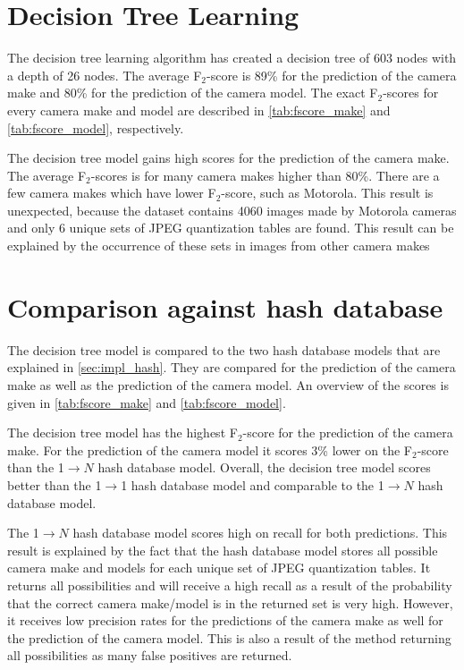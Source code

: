 \section{Decision Tree Learning}
The decision tree learning algorithm has created a decision tree of 603 nodes with a depth of 26 nodes. The average F$_2$-score is 89\% for the prediction of the camera make and 80\% for the prediction of the camera model. The exact F$_2$-scores for every camera make and model are described in \autoref{tab:fscore_make} and \autoref{tab:fscore_model}, respectively.

The decision tree model gains high scores for the prediction of the camera make. The average F$_2$-scores is for many camera makes higher than 80\%. There are a few camera makes which have lower F$_2$-score, such as Motorola. This result is unexpected, because the dataset contains 4060 images made by Motorola cameras and only 6 unique sets of JPEG quantization tables are found. This result can be explained by the occurrence of these sets in images from other camera makes





\section{Comparison against hash database}
The decision tree model is compared to the two hash database models that are explained in \autoref{sec:impl_hash}. They are compared for the prediction of the camera make as well as the prediction of the camera model. An overview of the scores is given in \autoref{tab:fscore_make} and \autoref{tab:fscore_model}.

The decision tree model has the highest F$_2$-score for the prediction of the camera make. For the prediction of the camera model it scores 3\% lower on the F$_2$-score than the 1$\rightarrow N$ hash database model. Overall, the decision tree model scores better than the 1$\rightarrow$1 hash database model and comparable to the 1$\rightarrow N$ hash database model.

The 1$\rightarrow N$ hash database model scores high on recall for both predictions. This result is explained by the fact that the hash database model stores all possible camera make and models for each unique set of JPEG quantization tables. It returns all possibilities and will receive a high recall as a result of the probability that the correct camera make/model is in the returned set is very high. However, it receives low precision rates for the predictions of the camera make as well for the prediction of the camera model. This is also a result of the method returning all possibilities as many false positives are returned.

